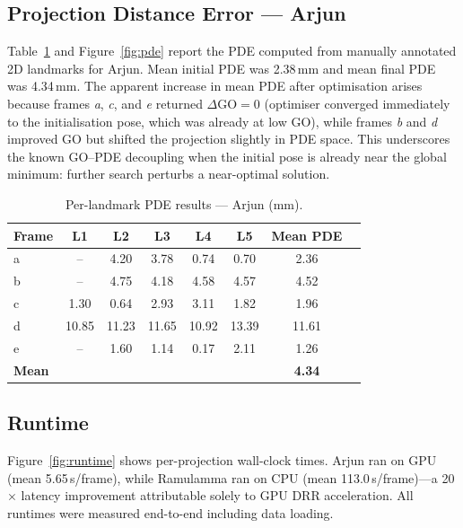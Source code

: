\documentclass[10pt,a4paper]{article}
\begin{document}
\subsection{Projection Distance Error — Arjun}
\label{sec:pde}

Table~\ref{tab:pde} and Figure~\ref{fig:pde} report the PDE computed
from manually annotated 2D landmarks for Arjun.
Mean initial PDE was 2.38\,mm and mean final PDE was 4.34\,mm.
The apparent increase in mean PDE after optimisation arises because
frames \textit{a}, \textit{c}, and \textit{e} returned $\Delta$GO$=0$
(optimiser converged immediately to the initialisation pose, which was
already at low GO), while frames \textit{b} and \textit{d} improved GO
but shifted the projection slightly in PDE space.
This underscores the known GO–PDE decoupling when the initial pose is
already near the global minimum: further search perturbs a
near-optimal solution.

\begin{table}[H]
\centering
\caption{Per-landmark PDE results — Arjun (mm).}
\label{tab:pde}
\begin{tabular}{lccccccc}
\toprule
\textbf{Frame} & \textbf{L1} & \textbf{L2} & \textbf{L3} & \textbf{L4} &
\textbf{L5} & \textbf{Mean PDE} \\
\midrule
a & --   & 4.20 & 3.78 & 0.74 & 0.70 & 2.36 \\
b & --   & 4.75 & 4.18 & 4.58 & 4.57 & 4.52 \\
c & 1.30 & 0.64 & 2.93 & 3.11 & 1.82 & 1.96 \\
d & 10.85 & 11.23 & 11.65 & 10.92 & 13.39 & 11.61 \\
e & --   & 1.60 & 1.14 & 0.17 & 2.11 & 1.26 \\
\midrule
\textbf{Mean} & & & & & & \textbf{4.34} \\
\bottomrule
\end{tabular}
\end{table}

\subsection{Runtime}
\label{sec:runtime}

Figure~\ref{fig:runtime} shows per-projection wall-clock times.
Arjun ran on GPU (mean 5.65\,s/frame), while Ramulamma ran on CPU
(mean 113.0\,s/frame)—a 20$\times$ latency improvement attributable
solely to GPU DRR acceleration.
All runtimes were measured end-to-end including data loading.

\end{document}
